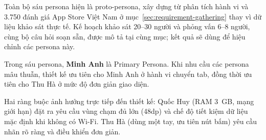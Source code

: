 Toàn bộ sáu persona hiện là proto-persona, xây dựng từ phân tích hành vi và 3.750 đánh giá App Store Việt Nam ở mục~\ref{sec:requirement-gathering} thay vì dữ liệu khảo sát thực tế. Kế hoạch khảo sát 20--30 người và phỏng vấn 6--8 người, cùng bộ câu hỏi soạn sẵn, được mô tả tại cùng mục; kết quả sẽ dùng để hiệu chỉnh các persona này.

Trong sáu persona, \textbf{Minh Anh} là Primary Persona. Khi nhu cầu các persona mâu thuẫn, thiết kế ưu tiên cho Minh Anh ở hành vi chuyển tab, đồng thời ưu tiên cho Thu Hà ở mức độ đơn giản giao diện.

Hai ràng buộc ảnh hưởng trực tiếp đến thiết kế: Quốc Huy (RAM 3~GB, mạng giới hạn) đặt ra yêu cầu vùng chạm đủ lớn (48dp) và chế độ tiết kiệm dữ liệu mặc định khi không có Wi-Fi. Thu Hà (dùng một tay, ưu tiên nút bấm) yêu cầu nhãn rõ ràng và điều khiển đơn giản.
